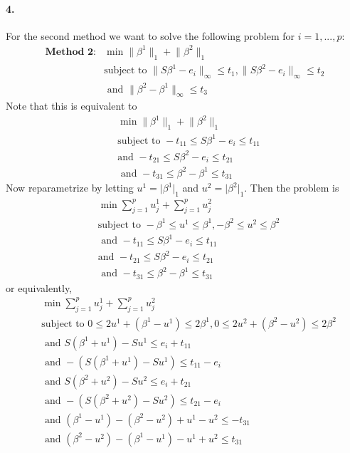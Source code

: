 \documentclass[12pt, leqno]{article}
\providecommand{\abs}[1]{\lvert#1\rvert}
\providecommand{\norm}[1]{\lVert#1\rVert}
\begin{document}
\paragraph{4.}
For the second method we want to solve the following problem for $i = 1,...,p$:
\begin{align*} \textbf{Method 2:}
&\min \norm{\beta^{1}}_1 + \norm{\beta^{2}}_1 \\
&\text{subject to } \norm{S\beta^{1} - e_i}_{\infty} \leq t_1 ,
  \norm{S\beta^{2} - e_i}_{\infty} \leq t_2 \\
&\text{ and } \norm{\beta^{2} - \beta^{1}}_{\infty} \leq t_3
\end{align*}
Note that this is equivalent to
\begin{align*}
&\min \norm{\beta^{1}}_1 + \norm{\beta^{2}}_1 \\
&\text{subject to } - t_11 \leq S\beta^{1} - e_i\leq t_11 \\
&\text{and }  -t_21 \leq S\beta^{2} - e_i \leq t_21 \\
&\text{ and } -t_31 \leq \beta^{2} - \beta^{1} \leq t_31
\end{align*}
Now reparametrize by letting $u^1 = \abs{\beta^{1}}_1$ and $u^2 =
\abs{\beta^{2}}_1$. Then the problem is 
\begin{align*}
&\min \sum_{j = 1}^p{u_j^1} +  \sum_{j = 1}^p{u_j^2} \\
&\text{subject to } -\beta^{1} \leq u^1 \leq \beta^{1},-\beta^{2} \leq
  u^2 \leq \beta^{2} \\
&\text{ and } - t_11 \leq S\beta^{1} - e_i\leq t_11 \\
&\text{and }  -t_21 \leq S\beta^{2} - e_i \leq t_21 \\
&\text{ and } -t_31 \leq \beta^{2} - \beta^{1} \leq t_31
\end{align*}
or equivalently,
\begin{align*}
&\min \sum_{j = 1}^p{u_j^1} +  \sum_{j = 1}^p{u_j^2} \\
&\text{subject to } 0 \leq 2u^1 + (\beta^{1}-u^1) \leq 2 \beta^{1},0 \leq 2u^2+
  (\beta^{2}-u^2) \leq 2\beta^{2} \\
&\text{ and } S(\beta^{1} + u^1) - Su^1\leq e_i + t_11 \\
&\text{ and }  - (S(\beta^{1} + u^1) - Su^1)  \leq t_11 - e_i \\
&\text{ and } S(\beta^{2} + u^2) - Su^2 \leq e_i + t_21 \\
&\text{ and }  - (S(\beta^{2} + u^2) - Su^2)  \leq t_21 - e_i \\
&\text{ and } (\beta^{1} - u^1) - (\beta^{2} - u^2) + u^1 - u^2 \leq -t_31 \\
&\text{ and } (\beta^{2}-u^2)- (\beta^{1}-u^1) - u^1 + u^2\leq t_31 \\
\end{align*}
\end{document}

